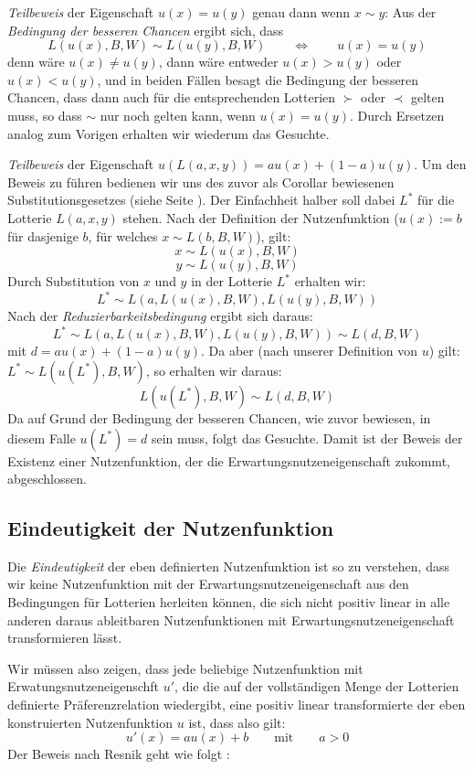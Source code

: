 {\em Teilbeweis} der Eigenschaft $u(x) = u(y)$ genau dann wenn $x \sim y$:
Aus der {\em Bedingung der besseren Chancen} ergibt sich, dass 
\[ L(u(x), B, W) \sim L(u(y), B, W) \qquad \Leftrightarrow \qquad u(x) = u(y)
\] 
denn wäre $u(x) \neq u(y)$, dann wäre entweder $u(x) > u(y)$ oder $u(x) < u(y)$,
und in beiden Fällen besagt die Bedingung der besseren Chancen, dass dann auch
für die entsprechenden Lotterien $\succ$ oder $\prec$ gelten muss, so dass
$\sim$ nur noch gelten kann, wenn $u(x) = u(y)$. Durch Ersetzen analog zum
Vorigen erhalten wir wiederum das Gesuchte.

{\em Teilbeweis} der Eigenschaft $u(L(a,x,y)) = au(x) + (1-a)u(y)$.
Um den Beweis zu führen bedienen wir uns des zuvor als
Corollar bewiesenen Substitutionsgesetzes (siehe Seite
\pageref{Substitutionsgesetz}). Der Einfachheit halber soll dabei $L^*$ für die
Lotterie $L(a, x, y)$ stehen. Nach der Definition der Nutzenfunktion ($u(x) :=
b$ für dasjenige $b$, für welches $x \sim L(b, B, W)$), gilt: \[ x \sim L(u(x),
B, W) \] \[ y \sim L(u(y), B, W) \]
Durch Substitution von $x$ und $y$ in der Lotterie $L^*$ erhalten wir:
\[ L^* \sim L(a, L(u(x),B,W), L(u(y),B,W)) \]
Nach der {\em Reduzierbarkeitsbedingung} ergibt sich daraus:
\[ L^* \sim L(a, L(u(x),B,W), L(u(y),B,W)) \sim L(d, B, W) \]
mit $d = au(x) + (1-a)u(y)$. Da aber (nach unserer Definition von $u$) gilt:
$L^* \sim L(u(L^*), B, W)$, so erhalten wir daraus: 
\[ L(u(L^*),B,W) \sim L(d,B,W) \]
Da auf Grund der Bedingung der besseren Chancen, wie zuvor bewiesen, in diesem
Falle $u(L^*) = d$ sein muss, folgt das Gesuchte. 
Damit ist der Beweis der Existenz einer Nutzenfunktion, der die
Erwartungsnutzeneigenschaft zukommt, abgeschlossen.

\subsection{Eindeutigkeit der Nutzenfunktion}
\label{EindeutigkeitNMU}
Die {\em Eindeutigkeit} der eben definierten 
Nutzenfunktion ist so zu verstehen, dass wir keine Nutzenfunktion mit der
Erwartungsnutzeneigenschaft aus den Bedingungen für Lotterien herleiten können,
die sich nicht positiv linear in alle
anderen daraus ableitbaren Nutzenfunktionen mit
Erwartungsnutzeneigenschaft transformieren lässt.

Wir müssen also zeigen, dass jede beliebige Nutzenfunktion mit
Erwatungsnutzeneigenschft $u'$, die die auf der vollständigen Menge der
Lotterien definierte Präferenzrelation wiedergibt, 
eine positiv linear transformierte der eben
konstruierten Nutzenfunktion $u$ ist, dass also gilt: 
\[ u'(x) = au(x) + b \qquad \mbox{mit} \qquad a > 0\] 
Der Beweis nach Resnik geht wie folgt \cite[S.97/98]{resnik:1987}:

